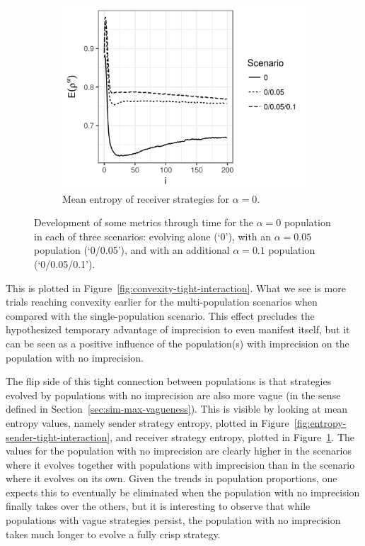 \documentclass[a4paper]{article}
\begin{document}
\begin{figure}
  \hfill
  \begin{subfigure}[]{0.32\textwidth}
    \includegraphics[width=\textwidth]{simulation/results/round-3/plots/entropy-receiver-all-strong.png}
    \caption{Mean entropy of receiver strategies for $\alpha = 0$.}
    \label{fig:entropy-receiver-tight-interaction}
  \end{subfigure}
  \caption{Development of some metrics through time for the $\alpha = 0$ population in each of three scenarios: evolving alone (`0'), with an $\alpha = 0.05$ population (`0/0.05'), and with an additional $\alpha = 0.1$ population (`0/0.05/0.1').}
  \label{fig:metrics-tight-interaction}
\end{figure}
This is plotted in Figure~\ref{fig:convexity-tight-interaction}.
What we see is more trials reaching convexity earlier for the multi-population scenarios when compared with the single-population scenario.
This effect precludes the hypothesized temporary advantage of imprecision to even manifest itself, but it can be seen as a positive influence of the population(s) with imprecision on the population with no imprecision.

The flip side of this tight connection between populations is that strategies evolved by populations with no imprecision are also more vague (in the sense defined in Section~\ref{sec:sim-max-vagueness}).
This is visible by looking at mean entropy values, namely sender strategy entropy, plotted in Figure~\ref{fig:entropy-sender-tight-interaction}, and receiver strategy entropy, plotted in Figure~\ref{fig:entropy-receiver-tight-interaction}.
The values for the population with no imprecision are clearly higher in the scenarios where it evolves together with populations with imprecision than in the scenario where it evolves on its own.
Given the trends in population proportions, one expects this to eventually be eliminated when the population with no imprecision finally takes over the others, but it is interesting to observe that while populations with vague strategies persist, the population with no imprecision takes much longer to evolve a fully crisp strategy.
\end{document}
